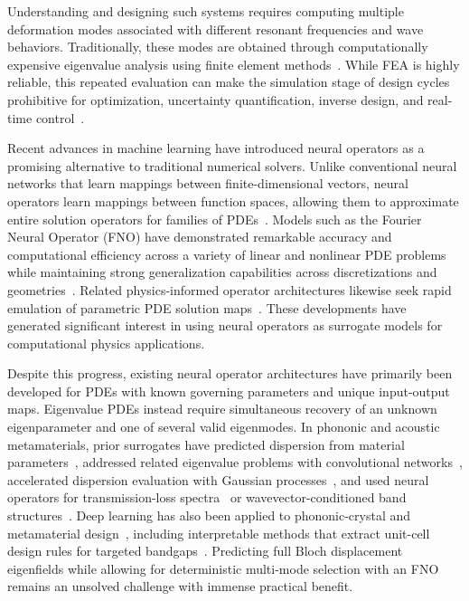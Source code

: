 \documentclass[preprint,review,12pt,numafflabel]{elsarticle}
\begin{document}
Understanding and designing such systems requires computing multiple deformation modes associated with different resonant frequencies and wave behaviors. Traditionally, these modes are obtained through computationally expensive eigenvalue analysis using finite element methods~\cite{Zhang2024uq}. While FEA is highly reliable, this repeated evaluation can make the simulation stage of design cycles prohibitive for optimization, uncertainty quantification, inverse design, and real-time control~\cite{Zhang2024uq,hussein2014dynamics}.

Recent advances in machine learning have introduced neural operators as a promising alternative to traditional numerical solvers. Unlike conventional neural networks that learn mappings between finite-dimensional vectors, neural operators learn mappings between function spaces, allowing them to approximate entire solution operators for families of PDEs~\cite{kovachki2023neural,lu2021deeponet}. Models such as the Fourier Neural Operator (FNO) have demonstrated remarkable accuracy and computational efficiency across a variety of linear and nonlinear PDE problems while maintaining strong generalization capabilities across discretizations and geometries~\cite{li2021fno}. Related physics-informed operator architectures likewise seek rapid emulation of parametric PDE solution maps~\cite{wang2021pidon}. These developments have generated significant interest in using neural operators as surrogate models for computational physics applications.

Despite this progress, existing neural operator architectures have primarily been developed for PDEs with known governing parameters and unique input-output maps. Eigenvalue PDEs instead require simultaneous recovery of an unknown eigenparameter and one of several valid eigenmodes. In phononic and acoustic metamaterials, prior surrogates have predicted dispersion from material parameters~\cite{liu2019dispersion}, addressed related eigenvalue problems with convolutional networks~\cite{finol2019eigenvalue}, accelerated dispersion evaluation with Gaussian processes~\cite{Ogren2024gpr}, and used neural operators for transmission-loss spectra~\cite{wagner2024neural} or wavevector-conditioned band structures~\cite{liu2026hybridfno}. Deep learning has also been applied to phononic-crystal and metamaterial design~\cite{liu2023deeplearning,jin2022intelligent,muhammad2022ml}, including interpretable methods that extract unit-cell design rules for targeted bandgaps~\cite{CHEN2022101895,Bastawrous2025}. Predicting full Bloch displacement eigenfields while allowing for deterministic multi-mode selection with an FNO remains an unsolved challenge with immense practical benefit.
\end{document}
